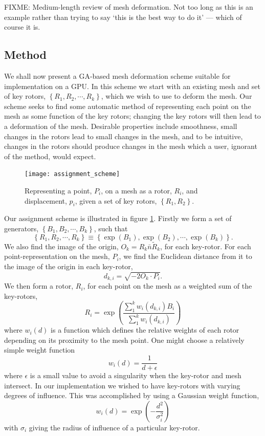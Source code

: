 FIXME: Medium-length review of mesh deformation. Not too long as this is an example
rather than trying to say `this is the best way to do it' --- which of course it is.

\subsection{Method}

We shall now present a GA-based mesh deformation scheme suitable for
implementation on a GPU. In this scheme we start with
an existing mesh and set of key rotors, $\left\{ R_1, R_2, \cdots, R_k \right\}$,
which we wish to use to deform the mesh. Our scheme seeks to find some automatic
method of representing each point on the mesh as some function of the key
rotors; changing the key rotors will then lead to a deformation of the mesh. Desirable
properties include smoothness, small changes in the rotors lead to small changes
in the mesh, and to be intuitive, changes in the rotors should produce changes
in the mesh which a user, ignorant of the method, would expect.

\begin{figure}
\centering
\texttt{[image: assignment\_scheme]}
\caption{\label{fig:assignment_scheme}Representing a point, $P_i$, on a mesh as
a rotor, $R_i$, and displacement, $p_i$, given a set of key rotors, 
  $\left\{R_1, R_2\right\}$.}
\end{figure}

Our assignment scheme is illustrated in figure \ref{fig:assignment_scheme}.
Firstly we form a set of generators, $\left\{B_1, B_2, \cdots, B_k\right\}$,
such that
\[
\left\{ R_1, R_2, \cdots, R_k \right\} \equiv \left\{\exp(B_1), \exp(B_2),
        \cdots, \exp(B_k)\right\}.
\]
We also find the image of the origin, $O_k = R_k\bar{n}\tilde{R}_k$, for 
each key-rotor. For each point-representation on the mesh, $P_i$, we find the Euclidean
distance from it to the image of the origin in each key-rotor,
\[
\label{eqn:dki}
d_{k,i} = \sqrt{-2O_k \cdot P_i}.
\]
We then form a rotor, $R_i$, for each point on the mesh as a weighted sum of the
key-rotors,
\[
R_i = \exp\left(\frac{\sum^{k}_1 w_i(d_{k,i}) B_i}{\sum^{k}_1 w_i(d_{k,i})}\right)
\]
where $w_i(d)$ is a function which defines the relative weights of each rotor depending
on its proximity to the mesh point. One might choose a relatively simple weight function
\[
w_i(d) = \frac{1}{d + \epsilon}
\]
where $\epsilon$ is a small value to avoid a singularity when the key-rotor and mesh
intersect. In our implementation we wished to have key-rotors with varying degrees of 
influence. This was accomplished by using a Gaussian weight function,
\[
w_i(d) = \exp\left(-\frac{d^2}{\sigma_i^2}\right)
\]
with $\sigma_i$ giving the radius of influence of a particular key-rotor.

